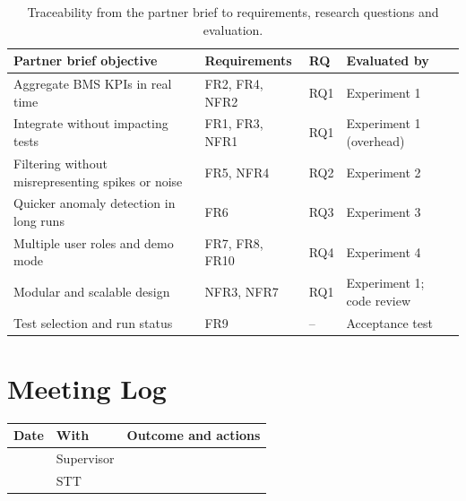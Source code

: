 \begin{table}[H]
    \centering\small
    \caption{Traceability from the partner brief to requirements, research questions and evaluation.}
    \label{tab:table}
    \begin{tabularx}{\textwidth}{YllY}
        \toprule
        Partner brief objective                           & Requirements   & RQ  & Evaluated by              \\
        \midrule
        Aggregate BMS KPIs in real time                   & FR2, FR4, NFR2 & RQ1 & Experiment 1              \\
        Integrate without impacting tests                 & FR1, FR3, NFR1 & RQ1 & Experiment 1 (overhead)   \\
        Filtering without misrepresenting spikes or noise & FR5, NFR4      & RQ2 & Experiment 2              \\
        Quicker anomaly detection in long runs            & FR6            & RQ3 & Experiment 3              \\
        Multiple user roles and demo mode                 & FR7, FR8, FR10 & RQ4 & Experiment 4              \\
        Modular and scalable design                       & NFR3, NFR7     & RQ1 & Experiment 1; code review \\
        Test selection and run status                     & FR9            & --  & Acceptance test           \\
        \bottomrule
    \end{tabularx}
\end{table}


\section{Meeting Log}\label{sec:meeting-log}
\begin{table}[H]
    \centering\small
    \begin{tabularx}{\textwidth}{llY}
        \toprule
        Date          & With       & Outcome and actions                                              \\
        \midrule
         & Supervisor &  \\
         & STT        &              \\
        \bottomrule
    \end{tabularx}\label{tab:table2}
\end{table}

